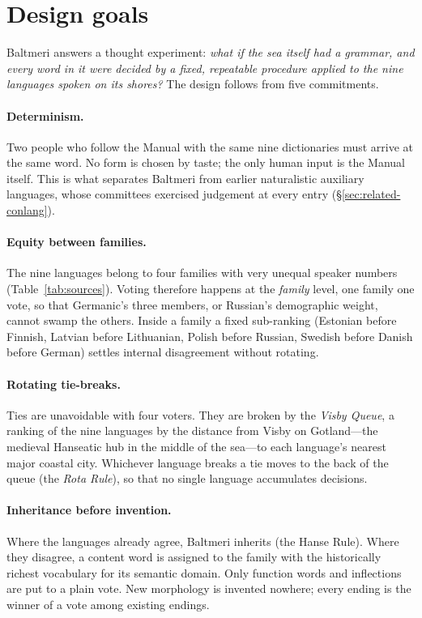 \section{Design goals}\label{sec:design}

Baltmeri answers a thought experiment: \emph{what if the sea itself had a grammar, and every word in it were decided by a fixed, repeatable procedure applied to the nine languages spoken on its shores?} The design follows from five commitments.

\paragraph{Determinism.} Two people who follow the Manual with the same nine dictionaries must arrive at the same word. No form is chosen by taste; the only human input is the Manual itself. This is what separates Baltmeri from earlier naturalistic auxiliary languages, whose committees exercised judgement at every entry (\S\ref{sec:related-conlang}).

\paragraph{Equity between families.} The nine languages belong to four families with very unequal speaker numbers (Table~\ref{tab:sources}). Voting therefore happens at the \emph{family} level, one family one vote, so that Germanic's three members, or Russian's demographic weight, cannot swamp the others. Inside a family a fixed sub-ranking (Estonian before Finnish, Latvian before Lithuanian, Polish before Russian, Swedish before Danish before German) settles internal disagreement without rotating.

\paragraph{Rotating tie-breaks.} Ties are unavoidable with four voters. They are broken by the \emph{Visby Queue}, a ranking of the nine languages by the distance from Visby on Gotland---the medieval Hanseatic hub in the middle of the sea---to each language's nearest major coastal city. Whichever language breaks a tie moves to the back of the queue (the \emph{Rota Rule}), so that no single language accumulates decisions.

\paragraph{Inheritance before invention.} Where the languages already agree, Baltmeri inherits (the Hanse Rule). Where they disagree, a content word is assigned to the family with the historically richest vocabulary for its semantic domain. Only function words and inflections are put to a plain vote. New morphology is invented nowhere; every ending is the winner of a vote among existing endings.

